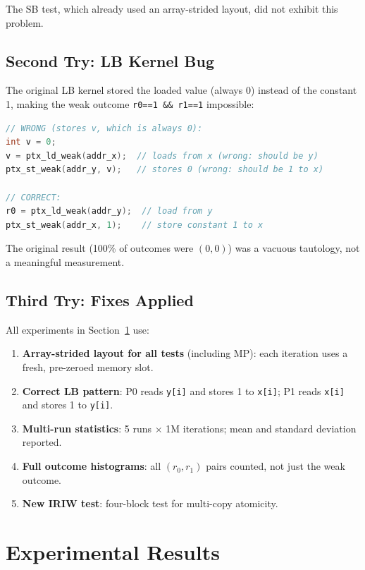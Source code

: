 \documentclass[a4paper]{article}
\begin{document}
The SB test, which already used an array-strided layout, did not exhibit this problem.

\subsection{Second Try: LB Kernel Bug}

The original LB kernel stored the loaded value (always 0) instead of the constant 1, making the weak outcome \texttt{r0==1 \&\& r1==1} impossible:

\begin{lstlisting}[language=C]
// WRONG (stores v, which is always 0):
int v = 0;
v = ptx_ld_weak(addr_x);  // loads from x (wrong: should be y)
ptx_st_weak(addr_y, v);   // stores 0 (wrong: should be 1 to x)

// CORRECT:
r0 = ptx_ld_weak(addr_y);  // load from y
ptx_st_weak(addr_x, 1);    // store constant 1 to x
\end{lstlisting}

The original result (100\% of outcomes were $(0,0)$) was a vacuous tautology, not a meaningful measurement.

\subsection{Third Try: Fixes Applied}

All experiments in Section~\ref{sec:results} use:
\begin{enumerate}
  \item \textbf{Array-strided layout for all tests} (including MP): each iteration uses a fresh, pre-zeroed memory slot.
  \item \textbf{Correct LB pattern}: P0 reads \texttt{y[i]} and stores 1 to \texttt{x[i]}; P1 reads \texttt{x[i]} and stores 1 to \texttt{y[i]}.
  \item \textbf{Multi-run statistics}: 5 runs $\times$ 1M iterations; mean and standard deviation reported.
  \item \textbf{Full outcome histograms}: all $(r_0, r_1)$ pairs counted, not just the weak outcome.
  \item \textbf{New IRIW test}: four-block test for multi-copy atomicity.
\end{enumerate}

\section{Experimental Results}
\label{sec:results}
\end{document}
